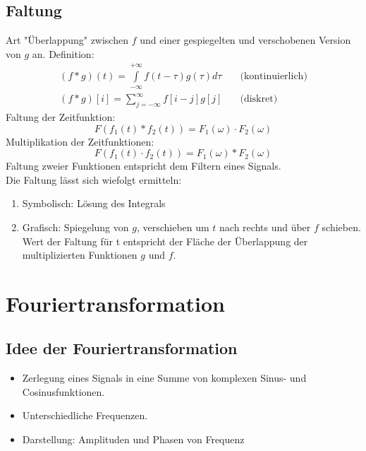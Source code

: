 \subsection{Faltung}

Art "{}Überlappung"{} zwischen $f$ und einer gespiegelten und verschobenen Version von $g$ an.
Definition: $$\begin{array}{cl} (f * g)(t) = \int\limits_{- \infty}^{+ \infty} f(t - \tau) g(\tau) d \tau & \quad \textrm{(kontinuierlich)} \\ (f * g)[i] = \sum\limits_{j = - \infty}^{\infty} f[i - j] g[j] & \quad \textrm{(diskret)} \end{array}$$
Faltung der Zeitfunktion: $$F(f_1(t) * f_2(t)) = F_1(\omega) \cdot F_2(\omega)$$
Multiplikation der Zeitfunktionen: $$F(f_1(t) \cdot f_2(t)) = F_1(\omega) * F_2(\omega)$$
Faltung zweier Funktionen entspricht dem Filtern eines Signals. \\[0,1cm]

Die Faltung lässt sich wiefolgt ermitteln:
\begin{enumerate}
	\item Symbolisch: Lösung des Integrals
	\item Grafisch: Spiegelung von $g$, verschieben um $t$ nach rechts und über $f$ schieben. Wert der Faltung für t entspricht der Fläche der Überlappung der multiplizierten Funktionen $g$ und $f$.
\end{enumerate}



\section{Fouriertransformation}

\subsection{Idee der Fouriertransformation}
\begin{itemize}
\item Zerlegung eines Signals in eine Summe von komplexen Sinus- und Cosinusfunktionen.
\item Unterschiedliche Frequenzen.
\item Darstellung: Amplituden und Phasen von Frequenz
\end{itemize}

